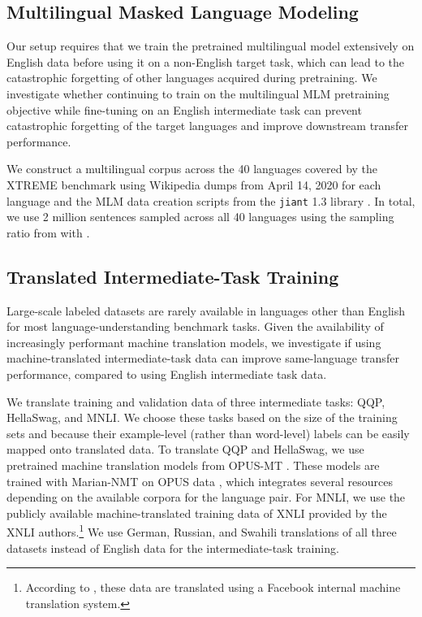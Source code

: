 \documentclass[11pt,a4paper]{article}
\begin{document}
\subsection{Multilingual Masked Language Modeling}
\label{sec:mlm}

Our setup requires that we train the pretrained multilingual model extensively on English data before using it on a non-English target task, which can lead to the catastrophic forgetting of other languages acquired during pretraining. We investigate whether continuing to train on the multilingual MLM pretraining objective while fine-tuning on an English intermediate task can prevent catastrophic forgetting of the target languages and improve downstream transfer performance. 

We construct a multilingual corpus across the 40 languages covered by the XTREME benchmark using Wikipedia dumps from April 14, 2020 for each language and the MLM data creation scripts from the \texttt{jiant} 1.3 library \citep{phang2020jiant}. In total, we use 2 million sentences sampled across all 40 languages using the sampling ratio from \citet{lample2019cross} with .


\subsection{Translated Intermediate-Task Training}
\label{sec:translation-approach}

Large-scale labeled datasets are rarely available in languages other than English for most language-understanding benchmark tasks.
Given the availability of increasingly performant machine translation models, we investigate if using machine-translated intermediate-task data can improve same-language transfer performance, compared to using English intermediate task data.


We translate training and validation data of three intermediate tasks: QQP, HellaSwag, and MNLI. We choose these tasks based on the size of the training sets and because their example-level (rather than word-level) labels can be easily mapped onto translated data. To translate QQP and HellaSwag, we use pretrained machine translation models from OPUS-MT \cite{TiedemannThottingalEAMT2020}. These models are trained with Marian-NMT \cite{mariannmt} on OPUS data \cite{TIEDEMANN12OPUS}, which integrates several resources depending on the available corpora for the language pair. For MNLI, we use the publicly available machine-translated training data of XNLI provided by the XNLI authors.\footnote{According to \citet{conneau-etal-2018-xnli}, these data are translated using a Facebook internal machine translation system.} We use German, Russian, and Swahili translations of all three datasets instead of English data for the intermediate-task training.
\end{document}
